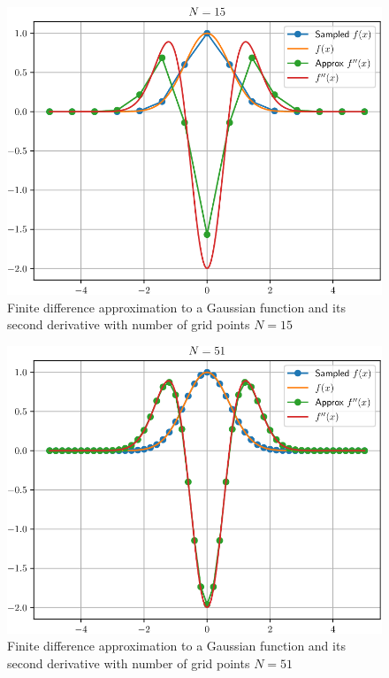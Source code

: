 \begin{figure}[h]
{\center
\includegraphics[width=\textwidth]{../codes/FD1d/IMG_gaussian_15.pdf}
\par}
\caption{Finite difference approximation to a Gaussian function and its second derivative with
number of grid points $N=15$}
\end{figure}

\begin{figure}[h]
{\center
\includegraphics[width=\textwidth]{../codes/FD1d/IMG_gaussian_51.pdf}
\par}
\caption{Finite difference approximation to a Gaussian function and its second derivative with
number of grid points $N=51$}
\end{figure}



